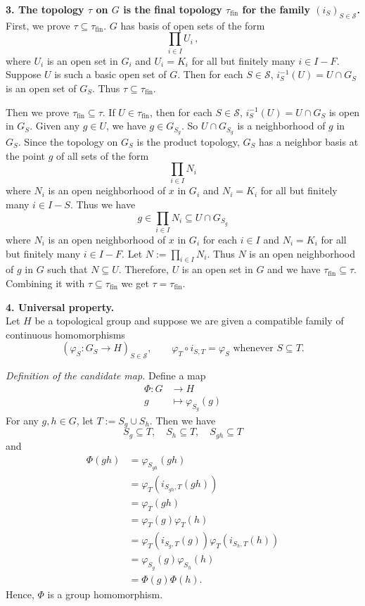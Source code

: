 \documentclass{report}
\begin{document}
\begin{prf}
	\smallskip
	\noindent\textbf{3. The topology $\tau$ on $G$ is the final topology $\tau_{\mathrm{fin}}$ for the family
	$(i_S)_{S\in\mathcal S}$.} \\
	First, we prove $\tau\subseteq \tau_{\mathrm{fin}}$. $G$ has basis of open sets of the form
	\[
	\prod_{i\in I} U_i\,,
	\]
	where \( U_i \) is an open set in \( G_i \) and \( U_i = K_i \) for all but finitely many \( i \in I-F\). Suppose \( U \) is such a basic open set of $G$. Then for each $S \in \mathcal{S}$, $i^{-1}_S(U)=U\cap G_S$ is an open set of $G_S$. Thus $\tau \subseteq \tau_{\mathrm{fin}}$. 
	
	Then we prove $\tau_{\mathrm{fin}}\subseteq \tau$. If $U \in \tau_{\mathrm{fin}}$, then for each $S \in \mathcal{S}$, $i^{-1}_S(U)=U\cap G_S$ is open in $G_S$. Given any $g\in U$, we have $g\in G_{S_g}$. So $U\cap G_{S_g}$ is a neighborhood of $g$ in $G_S$. Since the topology on $G_S$ is the product topology, $G_S$ has a neighbor basis at the point $g$ of all sets of the form
	\[
	\prod_{i\in I} N_i
	\]
	where $N_i$ is an open neighborhood of $x$ in $G_i$ and $N_i=K_i$ for all but finitely many $i\in I-S$. Thus we have
	\[
	g \in \prod_{i\in I} N_i \subseteq U\cap G_{S_g}
	\]
	where $N_i$ is an open neighborhood of $x$ in $G_i$ for each $i\in I$ and $N_i=K_i$ for all but finitely many $i\in I-F$. Let $N:=\prod_{i\in I} N_i$. Thus $N$ is an open neighborhood of $g$ in $G$ such that $N \subseteq U$. Therefore, $U$ is an open set in $G$ and we have $\tau_{\mathrm{fin}}\subseteq \tau$. Combining it with $\tau \subseteq \tau_{\mathrm{fin}}$ we get $\tau =\tau_{\mathrm{fin}}$.

	\smallskip
\noindent\textbf{4. Universal property.}\\
Let $H$ be a topological group and suppose we are given a compatible
family of continuous homomorphisms
\[
  (\varphi_S\colon G_S\to H)_{S\in\mathcal S},
  \qquad
  \varphi_T\circ i_{S,T}=\varphi_S \text{ whenever }S\subseteq T.
\]

\noindent\emph{Definition of the candidate map.}
Define a map
\begin{align*}
	\Phi\colon G &\longrightarrow H \\
	g &\longmapsto \varphi_{S_g}(g)
\end{align*}
For any $g,h\in G$, let $T:= S_{g} \cup S_{h}$. Then we have 
\[
S_g\subseteq T,\quad S_h\subseteq T,\quad S_{gh}\subseteq T
\]
and
\begin{align*}
	\Phi(gh)&=\varphi_{S_{gh}}(gh)\\
	&=\varphi_T(i_{S_{gh},T}(gh))\\
	&=\varphi_T(gh)\\
	&=\varphi_T(g)\varphi_T(h)\\
	&=\varphi_T\left(i_{S_g,T}(g)\right)\varphi_T\left(i_{S_h,T}(h)\right)\\
	&=\varphi_{S_g}(g)\varphi_{S_h}(h)\\
	&=\Phi(g)\Phi(h).
\end{align*}
Hence, $\Phi$ is a group homomorphism.


\end{prf}
\end{document}
